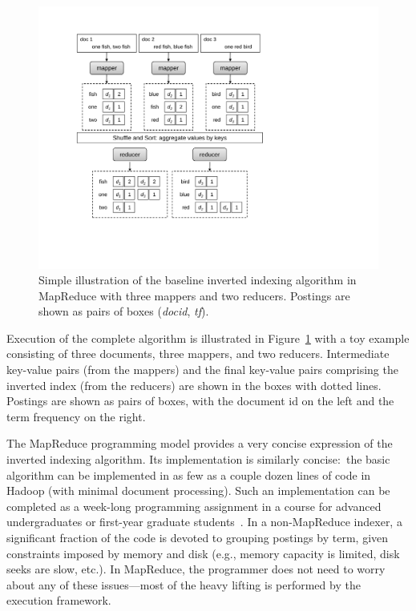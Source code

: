 \begin{figure}[t]
\begin{center}
\vspace{0.2cm}
\includegraphics[scale=0.6]{figures/fig-ch4-indexing-MR-baseline.pdf}
\vspace{-0.3cm}
\end{center}
\caption{Simple illustration of the baseline inverted indexing
  algorithm in MapReduce with three mappers and two reducers.
  Postings are shown as pairs of boxes (\emph{docid}, \emph{tf}).}
\label{chapter-indexing:MR-baseline}
\end{figure}

Execution of the complete algorithm is illustrated in
Figure~\ref{chapter-indexing:MR-baseline} with a toy example
consisting of three documents, three mappers, and two reducers.
Intermediate key-value pairs (from the mappers) and the final
key-value pairs comprising the inverted index (from the reducers) are
shown in the boxes with dotted lines.  Postings are shown as pairs of
boxes, with the document id on the left and the term frequency on the
right.

The MapReduce programming model provides a very concise expression of
the inverted indexing algorithm.  Its implementation is similarly
concise:\ the basic algorithm can be implemented in as few as a couple
dozen lines of code in Hadoop (with minimal document processing).
Such an implementation can be completed as a week-long programming
assignment in a course for advanced undergraduates or first-year
graduate students~\cite{KimballA_etal_2008,Lin_TeachCL2008}.  In a
non-MapReduce indexer, a significant fraction of the code is devoted
to grouping postings by term, given constraints imposed by memory and
disk (e.g., memory capacity is limited, disk seeks are slow, etc.).
In MapReduce, the programmer does not need to worry about any of these
issues---most of the heavy lifting is performed by the execution
framework.

